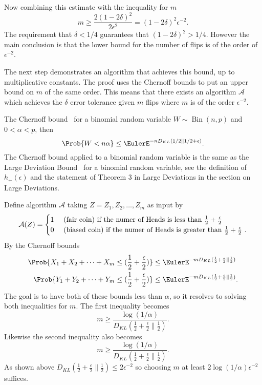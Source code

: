 \documentclass[12pt]{article}
\begin{document}
Now combining this estimate with the inequality for \( m \)
\[
    m \ge \frac{2 (1 - 2\delta)^2}{2 \epsilon^2} = (1 - 2\delta)^2
    \epsilon^{-2}.
\] The requirement that \( \delta < 1/4 \) guarantees that \( (1 - 2\delta)^2
> 1/4 \).  However the main conclusion is that the lower bound for the
number of flips is of the order of \( \epsilon^{-2} \).

The next step demonstrates an algorithm that achieves this bound, up to
multiplicative constants. The proof uses the Chernoff bounds to put an
upper bound on \( m \) of the same order.  This means that there exists
an algorithm \( \mathcal{A} \) which achieves the \( \delta \) error
tolerance given \( m \) flips where \( m \) is of the order \( \epsilon^
{-2} \).

The Chernoff bound~%
for a binomial random variable \( W \sim
\operatorname{Bin}
(n,p) \) and \( 0 < \alpha < p \), then
\[
    \Prob{W < n\alpha} \le \EulerE^{-n D_{KL}(1/2 \parallel 1/2+\epsilon)
    }.
\] The Chernoff bound applied to a binomial random variable is the same
as the Large Deviation Bound~%
for a binomial random variable, see the definition of \( h_+(\epsilon) \)
and the statement of Theorem 3 in 
{Large Deviations} in the section on Large Deviations.

Define algorithm \( \mathcal{A} \) taking \( Z = Z_1, Z_2, \ldots, Z_m \)
as input by
\[
    \mathcal{A}(Z) =
    \begin{cases}
        1 & \text{ (fair coin) if the numer of Heads is less than \(
        \frac{1}{2} + \frac{\epsilon}{2} \) } \\
        0 & \text{ (biased coin) if the numer of Heads is greater than \(
        \frac{1}{2} + \frac{\epsilon}{2} \) }.
    \end{cases}
\] By the Chernoff bounds
\begin{align*}
    \Prob{X_1 + X_2 + \cdots + X_m \le (\frac{1}{2} + \frac{\epsilon}{2})}
    &\le \EulerE^{-m D_{KL}(\frac{1}{2} + \frac{\epsilon}{2} \parallel
    \frac{1}{2}) } \\
    \Prob{Y_1 + Y_2 + \cdots + Y_m \le (\frac{1}{2} + \frac{\epsilon}{2})}
    &\le \EulerE^{-m D_{KL}(\frac{1}{2} + \frac{\epsilon}{2} \parallel
    \frac{1}{2}) }.
\end{align*}
The goal is to have both of these bounds less than \( \alpha \), so
it resolves to solving both inequalities for \( m \). The first
inequality becomes
\[
    m \ge \frac{\log(1/\alpha)}{D_{KL}(\frac{1}{2} + \frac{\epsilon}{2}
    \parallel \frac{1}{2})}.
\] Likewise the second inequality also becomes
\[
    m \ge \frac{\log(1/\alpha)}{D_{KL}(\frac{1}{2} + \frac{\epsilon}{2}
    \parallel \frac{1}{2})}.
\] As shown above \( D_{KL}(\frac{1}{2} + \frac{\epsilon}{2} \parallel
\frac{1}{2}) \le 2 \epsilon^{-2} \) so choosing \( m \) at least \( 2
\log(1/\alpha) \epsilon^{-2} \) suffices.
\end{document}
